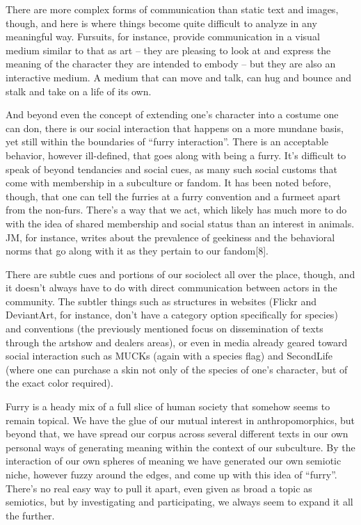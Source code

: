 There are more complex forms of communication than static text and images, though, and here is where things become quite difficult to analyze in any meaningful way. Fursuits, for instance, provide communication in a visual medium similar to that as art -- they are pleasing to look at and express the meaning of the character they are intended to embody -- but they are also an interactive medium. A medium that can move and talk, can hug and bounce and stalk and take on a life of its own.

And beyond even the concept of extending one's character into a costume one can don, there is our social interaction that happens on a more mundane basis, yet still within the boundaries of ``furry interaction''. There is an acceptable behavior, however ill-defined, that goes along with being a furry. It's difficult to speak of beyond tendancies and social cues, as many such social customs that come with membership in a subculture or fandom. It has been noted before, though, that one can tell the furries at a furry convention and a furmeet apart from the non-furs. There's a way that we act, which likely has much more to do with the idea of shared membership and social status than an interest in animals. JM, for instance, writes about the prevalence of geekiness and the behavioral norms that go along with it as they pertain to our fandom[8].

There are subtle cues and portions of our sociolect all over the place, though, and it doesn't always have to do with direct communication between actors in the community. The subtler things such as structures in websites (Flickr and DeviantArt, for instance, don't have a category option specifically for species) and conventions (the previously mentioned focus on dissemination of texts through the artshow and dealers areas), or even in media already geared toward social interaction such as MUCKs (again with a species flag) and SecondLife (where one can purchase a skin not only of the species of one's character, but of the exact color required).

Furry is a heady mix of a full slice of human society that somehow seems to remain topical. We have the glue of our mutual interest in anthropomorphics, but beyond that, we have spread our corpus across several different texts in our own personal ways of generating meaning within the context of our subculture. By the interaction of our own spheres of meaning we have generated our own semiotic niche, however fuzzy around the edges, and come up with this idea of ``furry''. There's no real easy way to pull it apart, even given as broad a topic as semiotics, but by investigating and participating, we always seem to expand it all the further.

